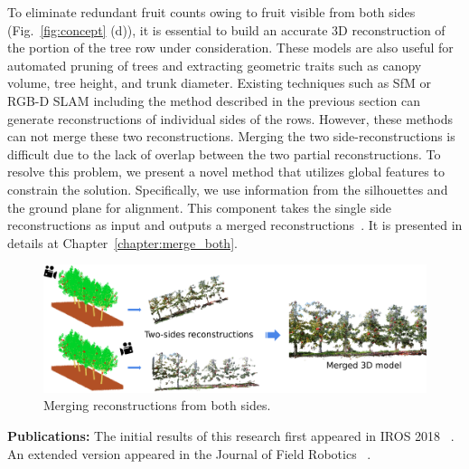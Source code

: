 To eliminate redundant fruit counts owing to fruit visible from both sides (Fig.~\ref{fig:concept} (d)), it is essential to build an accurate 3D reconstruction of the portion of the tree row under consideration. These models are also useful for automated pruning of trees and extracting geometric traits such as canopy volume, tree height, and trunk diameter.
Existing techniques such as SfM or RGB-D SLAM \cite{sturm2012benchmark,roy2016surveying} including the method described in the previous section can generate reconstructions of individual sides of the rows. However, these methods can not merge these two reconstructions. Merging the two side-reconstructions is difficult due to the lack of overlap between the two partial reconstructions. To resolve this problem, we present a novel method that utilizes global features to constrain the solution. Specifically, we use information from the silhouettes and the ground plane for alignment. This component takes the single side reconstructions as input and outputs a merged reconstructions~\cite{roy_registering_2018}. It is presented in details at Chapter~\ref{chapter:merge_both}.\\
 
\begin{figure}[!hbpt]
    \centering
    \includegraphics[width=\textwidth]{figures/prelim/problem_goal.png}
    \caption[Merging reconstructions from both sides.]{ Merging reconstructions from both sides.}
    \label{fig:fruit_yield_intro}
\end{figure}
\textbf{Publications:} The initial results of this research first appeared in IROS 2018 ~\cite{roy_registering_2018}. An extended version appeared in the Journal of Field Robotics~\cite{dong2018semantic} .

